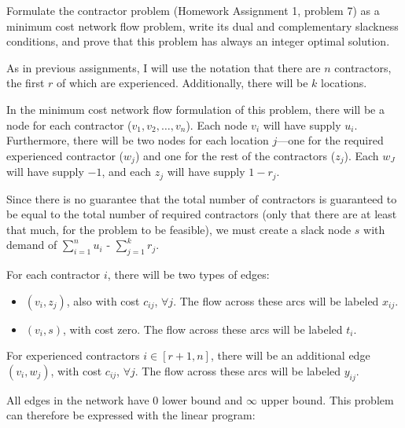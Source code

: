 \documentclass[fleqn]{homework}
\begin{document}
  \begin{problem}{2}
    \begin{question}
      Formulate the contractor problem (Homework Assignment 1, problem 7) as a
      minimum cost network ﬂow problem, write its dual and complementary
      slackness conditions, and prove that this problem has always an integer
      optimal solution.
    \end{question}

    As in previous assignments, I will use the notation that there are $n$
    contractors, the first $r$ of which are experienced.  Additionally, there
    will be $k$ locations.

    In the minimum cost network flow formulation of this problem, there will be
    a node for each contractor ($v_1, v_2, \dots, v_n$).  Each node $v_i$ will
    have supply $u_i$.  Furthermore, there will be two nodes for each location
    $j$---one for the required experienced contractor ($w_j$) and one for the
    rest of the contractors ($z_j$).  Each $w_J$ will have supply $-1$, and each
    $z_j$ will have supply $1-r_j$.

    Since there is no guarantee that the total number of contractors is
    guaranteed to be equal to the total number of required contractors (only
    that there are at least that much, for the problem to be feasible), we must
    create a slack node $s$ with demand of $\sum_{i=1}^n u_i$ -
    $\sum_{j=1}^k r_j$.

    For each contractor $i$, there will be two types of edges:
    
    \begin{itemize}
    \item $(v_i, z_j)$, also with cost $c_{ij}$, $\forall j$.  The flow across
      these arcs will be labeled $x_{ij}$.
    \item $(v_i, s)$, with cost zero.  The flow across these arcs will be
      labeled $t_i$.
    \end{itemize}

    For experienced contractors $i \in [r+1,n]$, there will be an additional
    edge $(v_i, w_j)$, with cost $c_{ij}$, $\forall j$.  The flow across these
    arcs will be labeled $y_{ij}$.

    All edges in the network have 0 lower bound and $\infty$ upper bound.  This
    problem can therefore be expressed with the linear program:


\end{problem}
\end{document}
